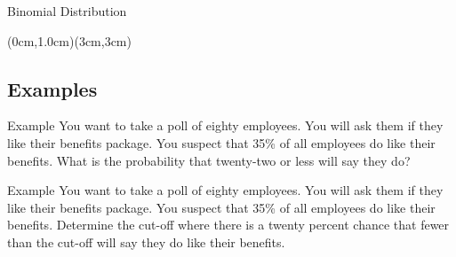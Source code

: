\begin{frame}{Binomial Distribution}

  (0cm,1.0cm)(3cm,3cm)
  
\end{frame}

\subsection{Examples}

\begin{frame}{Example}
  You want to take a poll of eighty employees. You will ask them if
  they like their benefits package. You suspect that 35\% of all
  employees do like their benefits. What is the probability that
  twenty-two or less will say they do?

  \vfill
\end{frame}


\begin{frame}{Example}
  You want to take a poll of eighty employees. You will ask them if
  they like their benefits package. You suspect that 35\% of all
  employees do like their benefits. Determine the cut-off where there
  is a twenty percent chance that fewer than the cut-off will say
  they do like their benefits.

  \vfill
\end{frame}


